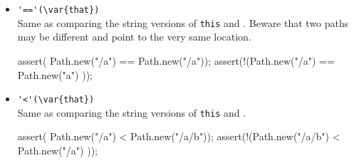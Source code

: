 \begin{itemize}
\item \lstinline|'=='(\var{that})|\\
  Same as comparing the string versions of \lstinline|this| and
  .  Beware that two paths may be different and point to the
  very same location.
\begin{urbiscript}[firstnumber=last]
assert(  Path.new("/a")  == Path.new("/a"));
assert(!(Path.new("/a")  == Path.new("a")  ));
\end{urbiscript}

\item \lstinline|'<'(\var{that})|\\
  Same as comparing the string versions of \lstinline|this| and
  .
\begin{urbiscript}[firstnumber=last]
assert(  Path.new("/a")   < Path.new("/a/b"));
assert(!(Path.new("/a/b") < Path.new("/a")  ));
\end{urbiscript}

\end{itemize}


